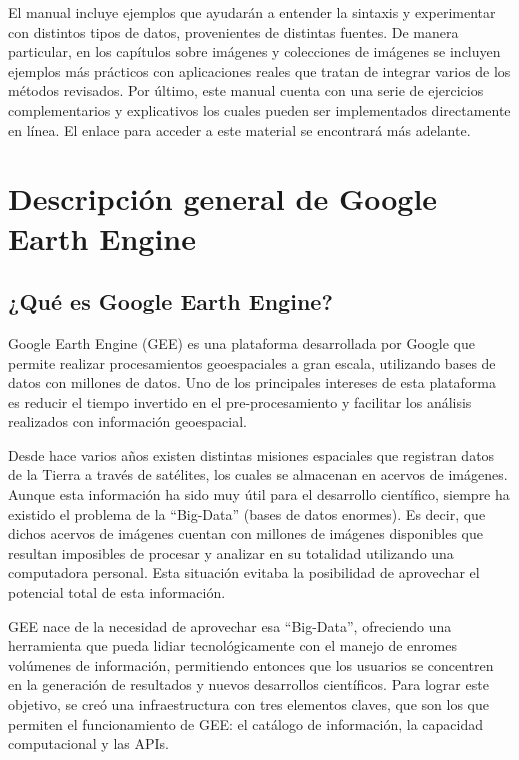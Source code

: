 \documentclass[
  12pt,
  letterpaper,
  twoside]{book}
\begin{document}
El manual incluye ejemplos que ayudarán a entender la sintaxis y experimentar con distintos tipos de datos, provenientes de distintas fuentes. De manera particular, en los capítulos sobre imágenes y colecciones de imágenes se incluyen ejemplos más prácticos con aplicaciones reales que tratan de integrar varios de los métodos revisados. Por último, este manual cuenta con una serie de ejercicios complementarios y explicativos los cuales pueden ser implementados directamente en línea. El enlace para acceder a este material se encontrará más adelante.

\hypertarget{descripciuxf3n-general-de-google-earth-engine}{%
\section{Descripción general de Google Earth Engine}\label{descripciuxf3n-general-de-google-earth-engine}}

\hypertarget{quuxe9-es-google-earth-engine}{%
\subsection*{¿Qué es Google Earth Engine?}\label{quuxe9-es-google-earth-engine}}

Google Earth Engine (GEE) es una plataforma desarrollada por Google que permite realizar procesamientos geoespaciales a gran escala, utilizando bases de datos con millones de datos. Uno de los principales intereses de esta plataforma es reducir el tiempo invertido en el pre-procesamiento y facilitar los análisis realizados con información geoespacial.

Desde hace varios años existen distintas misiones espaciales que registran datos de la Tierra a través de satélites, los cuales se almacenan en acervos de imágenes. Aunque esta información ha sido muy útil para el desarrollo científico, siempre ha existido el problema de la ``Big-Data'' (bases de datos enormes). Es decir, que dichos acervos de imágenes cuentan con millones de imágenes disponibles que resultan imposibles de procesar y analizar en su totalidad utilizando una computadora personal. Esta situación evitaba la posibilidad de aprovechar el potencial total de esta información.

GEE nace de la necesidad de aprovechar esa ``Big-Data'', ofreciendo una herramienta que pueda lidiar tecnológicamente con el manejo de enromes volúmenes de información, permitiendo entonces que los usuarios se concentren en la generación de resultados y nuevos desarrollos científicos. Para lograr este objetivo, se creó una infraestructura con tres elementos claves, que son los que permiten el funcionamiento de GEE: el catálogo de información, la capacidad computacional y las APIs.
\end{document}
